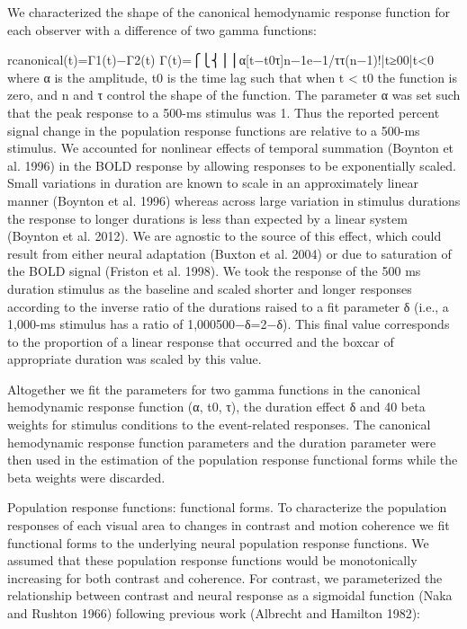 \documentclass{report}
\begin{document}
We characterized the shape of the canonical hemodynamic response function for each observer with a difference of two gamma functions:

rcanonical(t)=Γ1(t)−Γ2(t)
Γ(t)=⎧⎩⎨⎪⎪α[t−t0τ]n−1e−1/ττ(n−1)!|t≥00|t<0
where α is the amplitude, t0 is the time lag such that when t < t0 the function is zero, and n and τ control the shape of the function. The parameter α was set such that the peak response to a 500-ms stimulus was 1. Thus the reported percent signal change in the population response functions are relative to a 500-ms stimulus.
We accounted for nonlinear effects of temporal summation (Boynton et al. 1996) in the BOLD response by allowing responses to be exponentially scaled. Small variations in duration are known to scale in an approximately linear manner (Boynton et al. 1996) whereas across large variation in stimulus durations the response to longer durations is less than expected by a linear system (Boynton et al. 2012). We are agnostic to the source of this effect, which could result from either neural adaptation (Buxton et al. 2004) or due to saturation of the BOLD signal (Friston et al. 1998). We took the response of the 500 ms duration stimulus as the baseline and scaled shorter and longer responses according to the inverse ratio of the durations raised to a fit parameter δ (i.e., a 1,000-ms stimulus has a ratio of 1,000500−δ=2−δ). This final value corresponds to the proportion of a linear response that occurred and the boxcar of appropriate duration was scaled by this value.

Altogether we fit the parameters for two gamma functions in the canonical hemodynamic response function (α, t0, τ), the duration effect δ and 40 beta weights for stimulus conditions to the event-related responses. The canonical hemodynamic response function parameters and the duration parameter were then used in the estimation of the population response functional forms while the beta weights were discarded.

Population response functions: functional forms.
To characterize the population responses of each visual area to changes in contrast and motion coherence we fit functional forms to the underlying neural population response functions. We assumed that these population response functions would be monotonically increasing for both contrast and coherence. For contrast, we parameterized the relationship between contrast and neural response as a sigmoidal function (Naka and Rushton 1966) following previous work (Albrecht and Hamilton 1982):
\end{document}
